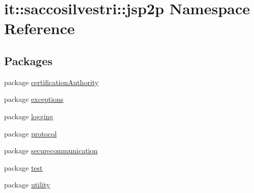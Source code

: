 \hypertarget{namespaceit_1_1saccosilvestri_1_1jsp2p}{
\section{it\-:\-:saccosilvestri\-:\-:jsp2p \-Namespace \-Reference}
\label{namespaceit_1_1saccosilvestri_1_1jsp2p}
}
\subsection*{\-Packages}
\begin{DoxyCompactItemize}
\item 
package \hyperlink{namespaceit_1_1saccosilvestri_1_1jsp2p_1_1certification_authority}{certification\-Authority}
\item 
package \hyperlink{namespaceit_1_1saccosilvestri_1_1jsp2p_1_1exceptions}{exceptions}
\item 
package \hyperlink{namespaceit_1_1saccosilvestri_1_1jsp2p_1_1logging}{logging}
\item 
package \hyperlink{namespaceit_1_1saccosilvestri_1_1jsp2p_1_1protocol}{protocol}
\item 
package \hyperlink{namespaceit_1_1saccosilvestri_1_1jsp2p_1_1securecommunication}{securecommunication}
\item 
package \hyperlink{namespaceit_1_1saccosilvestri_1_1jsp2p_1_1test}{test}
\item 
package \hyperlink{namespaceit_1_1saccosilvestri_1_1jsp2p_1_1utility}{utility}
\end{DoxyCompactItemize}
